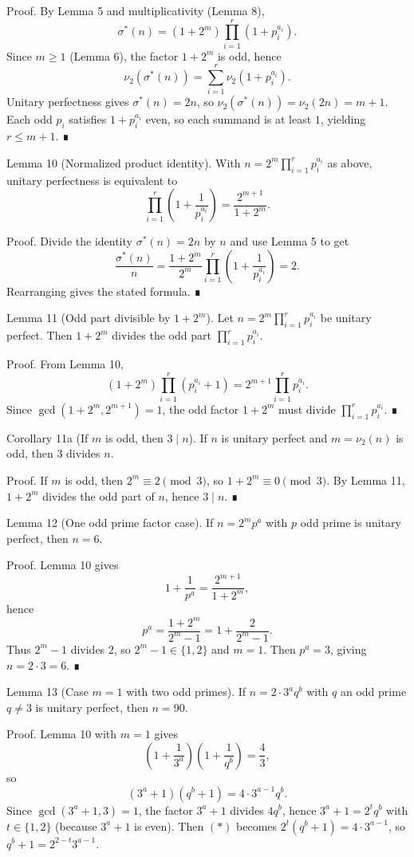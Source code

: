 Proof.
By Lemma 5 and multiplicativity (Lemma 8),
\[
\sigma^*(n)=(1+2^m)\prod_{i=1}^r (1+p_i^{a_i}).
\]
Since $m\ge 1$ (Lemma 6), the factor $1+2^m$ is odd, hence
\[
\nu_2(\sigma^*(n)) = \sum_{i=1}^r \nu_2(1+p_i^{a_i}).
\]
Unitary perfectness gives $\sigma^*(n)=2n$, so $\nu_2(\sigma^*(n))=\nu_2(2n)=m+1$.
Each odd $p_i$ satisfies $1+p_i^{a_i}$ even, so each summand is at least $1$, yielding $r\le m+1$. ∎

Lemma 10 (Normalized product identity).
With $n=2^m \prod_{i=1}^r p_i^{a_i}$ as above, unitary perfectness is equivalent to
\[
\prod_{i=1}^r \left(1+\frac{1}{p_i^{a_i}}\right)=\frac{2^{m+1}}{1+2^m}.
\]

Proof.
Divide the identity $\sigma^*(n)=2n$ by $n$ and use Lemma 5 to get
\[
\frac{\sigma^*(n)}{n} = \frac{1+2^m}{2^m}\prod_{i=1}^r \left(1+\frac{1}{p_i^{a_i}}\right)=2.
\]
Rearranging gives the stated formula. ∎

Lemma 11 (Odd part divisible by $1+2^m$).
Let $n=2^m \prod_{i=1}^r p_i^{a_i}$ be unitary perfect. Then $1+2^m$ divides
the odd part $\prod_{i=1}^r p_i^{a_i}$.

Proof.
From Lemma 10,
\[
(1+2^m)\prod_{i=1}^r (p_i^{a_i}+1)=2^{m+1}\prod_{i=1}^r p_i^{a_i}.
\]
Since $\gcd(1+2^m,2^{m+1})=1$, the odd factor $1+2^m$ must divide
$\prod_{i=1}^r p_i^{a_i}$. ∎

Corollary 11a (If $m$ is odd, then $3\mid n$).
If $n$ is unitary perfect and $m=\nu_2(n)$ is odd, then $3$ divides $n$.

Proof.
If $m$ is odd, then $2^m\equiv 2 \pmod{3}$, so $1+2^m\equiv 0 \pmod{3}$.
By Lemma 11, $1+2^m$ divides the odd part of $n$, hence $3\mid n$. ∎

Lemma 12 (One odd prime factor case).
If $n=2^m p^a$ with $p$ odd prime is unitary perfect, then $n=6$.

Proof.
Lemma 10 gives
\[
1+\frac{1}{p^a}=\frac{2^{m+1}}{1+2^m},
\]
hence
\[
p^a=\frac{1+2^m}{2^m-1}=1+\frac{2}{2^m-1}.
\]
Thus $2^m-1$ divides $2$, so $2^m-1\in\{1,2\}$ and $m=1$.
Then $p^a=3$, giving $n=2\cdot 3=6$. ∎

Lemma 13 (Case $m=1$ with two odd primes).
If $n=2\cdot 3^a q^b$ with $q$ an odd prime $q\ne 3$ is unitary perfect, then $n=90$.

Proof.
Lemma 10 with $m=1$ gives
\[
\left(1+\frac{1}{3^a}\right)\left(1+\frac{1}{q^b}\right)=\frac{4}{3},
\]
so
\[
(3^a+1)(q^b+1)=4\cdot 3^{a-1} q^b. \tag{*}
\]
Since $\gcd(3^a+1,3)=1$, the factor $3^a+1$ divides $4q^b$, hence
$3^a+1=2^t q^b$ with $t\in\{1,2\}$ (because $3^a+1$ is even).
Then $(*)$ becomes $2^t(q^b+1)=4\cdot 3^{a-1}$, so
$q^b+1=2^{2-t}3^{a-1}$.

